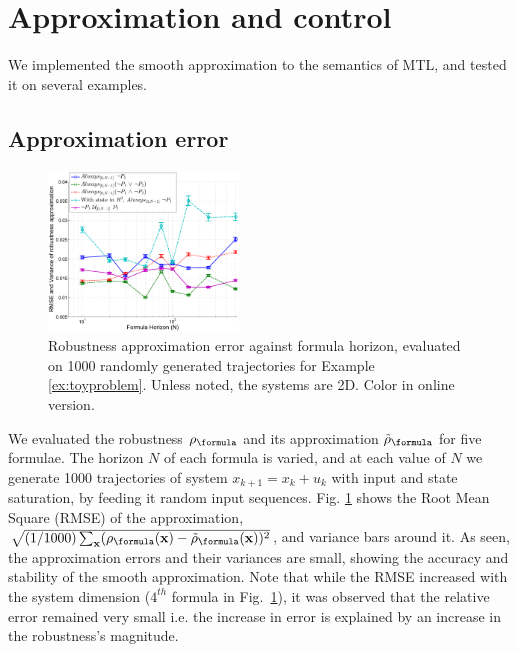 \section{Approximation and control}
\label{sec:examples}
We implemented the smooth approximation to the semantics of MTL, and tested it on several examples.

\subsection{Approximation error }
\label{sec: ex apx error}
\begin{figure}[t]
\centering
\includegraphics[width=0.45\textwidth]{figures/RobustnessError_corrected_scissored}
\vspace{-5pt}
\caption{{\small Robustness approximation error against formula horizon, evaluated on 1000 randomly generated trajectories for Example \ref{ex:toyproblem}. Unless noted, the systems are 2D. Color in online version.}}
\vspace{-10pt}
\label{fig:sample result}
\end{figure}

We evaluated the robustness $\robf$ and its approximation $\srobf$ for five formulae.
The horizon $N$ of each formula is varied, and at each value of $N$ we generate 1000 trajectories of system $x_{k+1} = x_k+u_k$ with input and state saturation, by feeding it random input sequences.
Fig. \ref{fig:sample result} shows the Root Mean Square (RMSE) of the approximation, $\sqrt{(1/1000)\sum_{\sstraj}(\robf(\sstraj)-\srobf(\sstraj))^2}$, and variance bars around it. 
As seen, the approximation errors and their variances are small, showing the accuracy and stability of the smooth approximation.
Note that while the RMSE  increased with the system dimension ($4^{th}$ formula in Fig.~\ref{fig:sample result}), it was observed that the relative error remained very small i.e. the increase in error is explained by an increase in the robustness's magnitude. 


